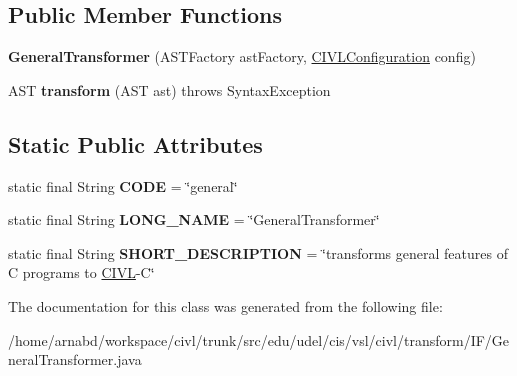\subsection*{Public Member Functions}
\begin{DoxyCompactItemize}
\item 
\hypertarget{classedu_1_1udel_1_1cis_1_1vsl_1_1civl_1_1transform_1_1IF_1_1GeneralTransformer_aa87c08daef23a9c6c25de1ad5761609c}{}{\bfseries General\+Transformer} (A\+S\+T\+Factory ast\+Factory, \hyperlink{classedu_1_1udel_1_1cis_1_1vsl_1_1civl_1_1config_1_1IF_1_1CIVLConfiguration}{C\+I\+V\+L\+Configuration} config)\label{classedu_1_1udel_1_1cis_1_1vsl_1_1civl_1_1transform_1_1IF_1_1GeneralTransformer_aa87c08daef23a9c6c25de1ad5761609c}

\item 
\hypertarget{classedu_1_1udel_1_1cis_1_1vsl_1_1civl_1_1transform_1_1IF_1_1GeneralTransformer_a0f9735142a14894c89f8a46d0bbaebc6}{}A\+S\+T {\bfseries transform} (A\+S\+T ast)  throws Syntax\+Exception \label{classedu_1_1udel_1_1cis_1_1vsl_1_1civl_1_1transform_1_1IF_1_1GeneralTransformer_a0f9735142a14894c89f8a46d0bbaebc6}

\end{DoxyCompactItemize}
\subsection*{Static Public Attributes}
\begin{DoxyCompactItemize}
\item 
\hypertarget{classedu_1_1udel_1_1cis_1_1vsl_1_1civl_1_1transform_1_1IF_1_1GeneralTransformer_a0e7300ea4c66e3371b7f49901518b856}{}static final String {\bfseries C\+O\+D\+E} = \char`\"{}general\char`\"{}\label{classedu_1_1udel_1_1cis_1_1vsl_1_1civl_1_1transform_1_1IF_1_1GeneralTransformer_a0e7300ea4c66e3371b7f49901518b856}

\item 
\hypertarget{classedu_1_1udel_1_1cis_1_1vsl_1_1civl_1_1transform_1_1IF_1_1GeneralTransformer_a5b68b5088a796d46e95e03c59f4b00cd}{}static final String {\bfseries L\+O\+N\+G\+\_\+\+N\+A\+M\+E} = \char`\"{}General\+Transformer\char`\"{}\label{classedu_1_1udel_1_1cis_1_1vsl_1_1civl_1_1transform_1_1IF_1_1GeneralTransformer_a5b68b5088a796d46e95e03c59f4b00cd}

\item 
\hypertarget{classedu_1_1udel_1_1cis_1_1vsl_1_1civl_1_1transform_1_1IF_1_1GeneralTransformer_a92ac04807f9e499b59e4e9882c06f514}{}static final String {\bfseries S\+H\+O\+R\+T\+\_\+\+D\+E\+S\+C\+R\+I\+P\+T\+I\+O\+N} = \char`\"{}transforms general features of C programs to \hyperlink{classedu_1_1udel_1_1cis_1_1vsl_1_1civl_1_1CIVL}{C\+I\+V\+L}-\/C\char`\"{}\label{classedu_1_1udel_1_1cis_1_1vsl_1_1civl_1_1transform_1_1IF_1_1GeneralTransformer_a92ac04807f9e499b59e4e9882c06f514}

\end{DoxyCompactItemize}


The documentation for this class was generated from the following file\+:\begin{DoxyCompactItemize}
\item 
/home/arnabd/workspace/civl/trunk/src/edu/udel/cis/vsl/civl/transform/\+I\+F/General\+Transformer.\+java\end{DoxyCompactItemize}
